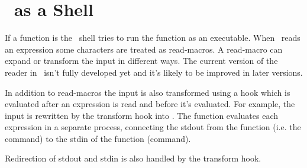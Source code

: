 \section{\lips\ as a Shell}
If a function is  the \lips\ shell tries to run the
function as an executable.  When \lips\ reads an expression some
characters are treated as read-macros.  A read-macro can expand or
transform the input in different ways.  The current version of the
reader in \lips\ isn't fully developed yet and it's likely to be
improved in later versions.

In addition to read-macros the input is also transformed using a hook
which is evaluated after an expression is read and before it's
evaluated.  For example, the input  is rewritten by
the transform hook into .  The
 function evaluates each expression in a separate
process, connecting the stdout from the  function (i.e. the
 command) to the stdin of the  function (command).

Redirection of stdout and stdin is also handled by the transform hook.
